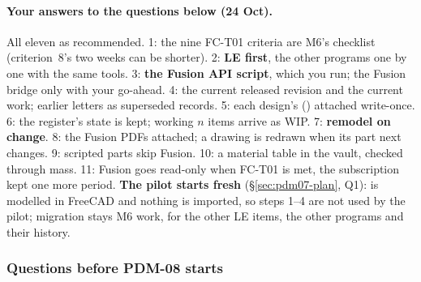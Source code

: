 \paragraph{Your answers to the questions below (24 Oct).} All eleven as recommended. 1: the nine FC-T01 criteria are
M6's checklist (criterion~8's two weeks can be shorter). 2: \textbf{LE first}, the other programs one by one with the
same tools. 3: \textbf{the Fusion API script}, which you run; the Fusion bridge only with your go-ahead. 4: the current
released revision and the current work; earlier letters as superseded records. 5: each design's 
() attached write-once. 6: the register's state is kept; working $n$ items arrive as WIP. 7:
\textbf{remodel on change}. 8: the Fusion PDFs attached; a drawing is redrawn when its part next changes. 9: scripted
parts skip Fusion. 10: a material table in the vault, checked through mass. 11: Fusion goes read-only when FC-T01 is
met, the subscription kept one more period. \textbf{The pilot starts fresh} (\S\ref{sec:pdm07-plan}, Q1): 
is modelled in FreeCAD and nothing is imported, so steps 1--4 are not used by the pilot; migration stays M6 work, for
the other LE items, the other programs and their history.

\subsubsection*{Questions before PDM-08 starts}

